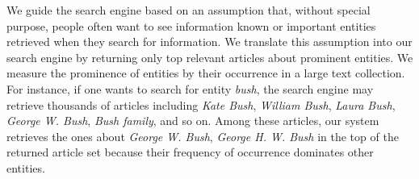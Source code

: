 We guide the search engine based on an assumption that, without special purpose, people often want to see information known or important entities retrieved when they search for information. We translate this assumption into our search engine by returning only top relevant articles about prominent entities. We measure the prominence of entities by their occurrence in a large text collection. For instance, if one wants to search for entity {\em bush}, the search engine may retrieve thousands of articles including {\em Kate Bush}, {\em William Bush}, {\em Laura Bush}, {\em George W. Bush}, {\em Bush family}, and so on. Among these articles, our system retrieves the ones about {\em George W. Bush}, {\em George H. W. Bush} in the top of the returned article set because their frequency of occurrence dominates other entities.











